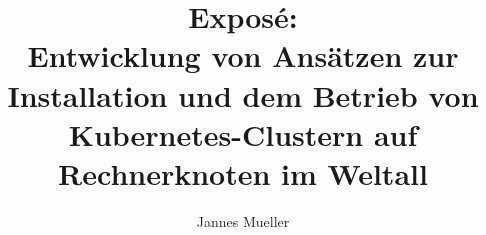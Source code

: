 \documentclass[
  ngerman,
  symmetric,
  cdfont=on,
  numbers=noenddot,
  parskip
]{tudscrreprt}
\begin{document}

\department{}

\title{%
  Exposé:\\ Entwicklung von Ansätzen zur Installation und dem Betrieb von Kubernetes-Clustern auf Rechnerknoten im Weltall
}

\makeatletter
\makeatother
\date{}
\author{Jannes Mueller}

\maketitle
\newpage

\tableofcontents
\cleardoublepage
\markboth{}{}
\newpage
\end{document}

